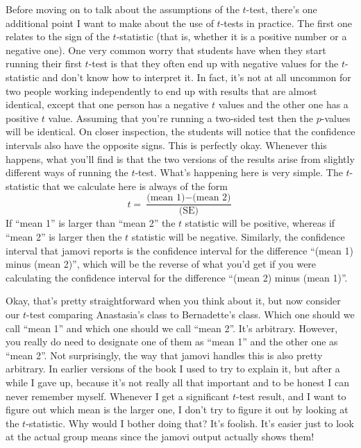 
Before moving on to talk about the assumptions of the $t$-test, there's one additional point I want to make about the use of $t$-tests in practice. The first one relates to the sign of the $t$-statistic (that is, whether it is a positive number or a negative one).  One very common worry that students have when they start running their first $t$-test is that they often end up with negative values for the $t$-statistic and don't know how to interpret it. In fact, it's not at all uncommon for two  people working independently to end up with results that are almost identical, except that one person has a negative $t$ values and the other one has a positive $t$ value. Assuming that you're running a two-sided test then the $p$-values will be identical. On closer inspection, the students will notice that the confidence intervals also have the opposite signs. This is perfectly okay. Whenever this happens, what you'll find is that the two versions of the results arise from slightly different ways of running the $t$-test. What's happening here is very simple. The $t$-statistic that we calculate here is always of the form 
$$
t = \frac{\mbox{(mean 1)} -\mbox{(mean 2)}}{ \mbox{(SE)}}
$$
If ``mean 1'' is larger than ``mean 2'' the $t$ statistic will be positive, whereas if ``mean 2'' is larger then the $t$ statistic will be negative. Similarly, the confidence interval that jamovi reports is the confidence interval for the difference ``(mean 1) minus (mean 2)'', which will be the reverse of what you'd get if you were calculating the confidence interval for the difference ``(mean 2) minus (mean 1)''.

Okay, that's pretty straightforward when you think about it, but now consider our $t$-test comparing Anastasia's class to Bernadette's class. Which one should we call ``mean 1'' and which one should we call ``mean 2''. It's arbitrary. However, you really do need to designate one of them as ``mean 1'' and the other one as ``mean 2''. Not surprisingly, the way that jamovi handles this is also pretty arbitrary. In earlier versions of the book I used to try to explain it, but after a while I gave up, because it's not really all that important and to be honest I can never remember myself. Whenever I get a significant $t$-test result, and I want to figure out which mean is the larger one, I don't try to figure it out by looking at the $t$-statistic. Why would I bother doing that? It's foolish. It's easier just to look at the actual group means since the jamovi output actually shows them!

